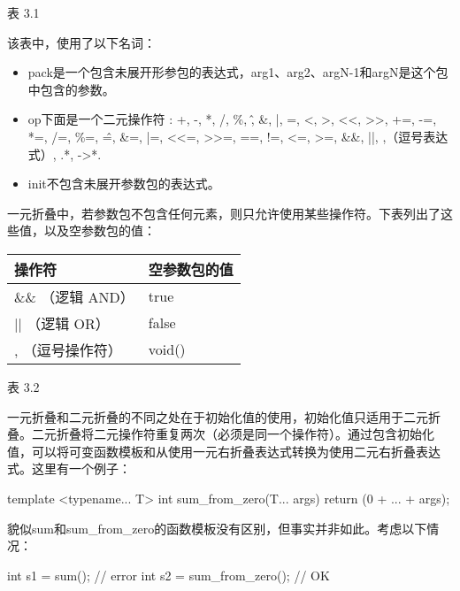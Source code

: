 \begin{center}
表 3.1
\end{center}

该表中，使用了以下名词：

\begin{itemize}
\item
pack是一个包含未展开形参包的表达式，arg1、arg2、argN-1和argN是这个包中包含的参数。

\item
op下面是一个二元操作符 : +, -, *, /, \%, \^, \&, |, =, <, >, <{}<, >{}>, +=, -=, *=, /=, \%=, \^=, \&=, |=, <{}<=, >{}>=, ==, !=, <=, >=, \&\&, ||, ,（逗号表达式）, .*, ->*.

\item
init不包含未展开参数包的表达式。
\end{itemize}

一元折叠中，若参数包不包含任何元素，则只允许使用某些操作符。下表列出了这些值，以及空参数包的值：

\begin{table}[H]
\centering
	\begin{tabular}{|l|l|}
		\hline
		\textbf{操作符}  & \textbf{空参数包的值} \\ \hline
		\&\& （逻辑 AND） & true                             \\ \hline
		|| （逻辑 OR）    & false                            \\ \hline
		, （逗号操作符） & void()                           \\ \hline
	\end{tabular}
\end{table}

\begin{center}
表 3.2
\end{center}

一元折叠和二元折叠的不同之处在于初始化值的使用，初始化值只适用于二元折叠。二元折叠将二元操作符重复两次（必须是同一个操作符）。通过包含初始化值，可以将可变函数模板和从使用一元右折叠表达式转换为使用二元右折叠表达式。这里有一个例子：

\begin{cpp}
template <typename... T>
int sum_from_zero(T... args)
{
	return (0 + ... + args);
}
\end{cpp}

貌似sum和sum\_from\_zero的函数模板没有区别，但事实并非如此。考虑以下情况：

\begin{cpp}
int s1 = sum(); // error
int s2 = sum_from_zero(); // OK
\end{cpp}

